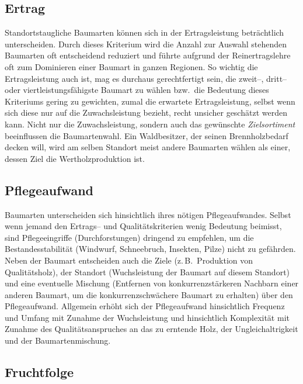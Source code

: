 \documentclass[twocolumn]{scrartcl}
\begin{document}
\subsection{Ertrag}
\label{ssec:ertrag}

Standortstaugliche Baumarten können sich in der Ertragsleistung
beträchtlich unterscheiden. Durch dieses Kriterium wird die Anzahl zur
Auswahl stehenden Baumarten oft entscheidend reduziert und führte
aufgrund der Reinertragslehre oft zum Dominieren einer Baumart in
ganzen Regionen. So wichtig die Ertragsleistung auch ist, mag es
durchaus gerechtfertigt sein, die zweit--, dritt-- oder
viertleistungsfähigste Baumart zu wählen bzw.\ die Bedeutung dieses
Kriteriums gering zu gewichten, zumal die erwartete Ertragsleistung,
selbst wenn sich diese nur auf die Zuwachsleistung bezieht, recht
unsicher geschätzt werden kann. Nicht nur die Zuwachsleistung, sondern
auch das gewünschte \emph{Zielsortiment} beeinflussen die
Baumartenwahl. Ein Waldbesitzer, der seinen Brennholzbedarf decken
will, wird am selben Standort meist andere Baumarten wählen als einer,
dessen Ziel die Wertholzproduktion ist.

\subsection{Pflegeaufwand}
\label{ssec:pflegeaufwand}

Baumarten unterscheiden sich hinsichtlich ihres nötigen
Pflegeaufwandes. Selbst wenn jemand den Ertrags-- und
Qualitätskriterien wenig Bedeutung beimisst, sind Pflegeeingriffe
(Durchforstungen) dringend zu empfehlen, um die Bestandesstabilität
(Windwurf, Schneebruch, Insekten, Pilze) nicht zu gefährden. Neben der
Baumart entscheiden auch die Ziele (z.\,B.\ Produktion von
Qualitätsholz), der Standort (Wuchsleistung der Baumart auf diesem
Standort) und eine eventuelle Mischung (Entfernen von
konkurrenzstärkeren Nachbarn einer anderen Baumart, um die
konkurrenzschwächere Baumart zu erhalten) über den Pflegeaufwand. Allgemein
erhöht sich der Pflegeaufwand hinsichtlich Frequenz und Umfang mit
Zunahme der Wuchsleistung und hinsichtlich Komplexität mit Zunahme
des Qualitätsanspruches an das zu erntende Holz, der
Ungleichaltrigkeit und der Baumartenmischung.

\subsection{Fruchtfolge}
\label{ssec:Fruchtfolge}
\end{document}
